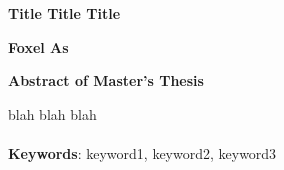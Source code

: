 \thispagestyle{empty}
\begin{center}
    \Large
    \textbf{Title Title Title}
 
    \vspace{0.4cm}
    \textbf{Foxel As}
 
    \vspace{0.9cm}
    \textbf{Abstract of Master's Thesis}
   
\end{center}

\blindtext 
blah blah blah 
    \\
    \\
    \textbf{Keywords}: keyword1, keyword2, keyword3  